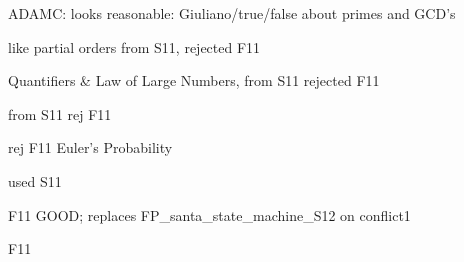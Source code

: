 \documentclass[quiz]{mcs}
\begin{document}
\conflictfinaltwo


\examspace 
\begin{editingnotes}
ADAMC: looks reasonable: Giuliano/true/false about primes and GCD's
\end{editingnotes}

\examspace 
\begin{editingnotes}like partial orders from S11, rejected F11\end{editingnotes}

\examspace  
\begin{editingnotes}
Quantifiers \& Law of Large Numbers, from S11 rejected F11
\end{editingnotes}

\examspace
\begin{editingnotes} from S11 rej F11\end{editingnotes}

\examspace  
\begin{editingnotes}rej F11 Euler's Probability\end{editingnotes}

\examspace 
\begin{editingnotes}used S11\end{editingnotes}

\examspace 
\begin{editingnotes}
F11 GOOD; replaces FP_santa_state_machine_S12 on conflict1
\end{editingnotes}

\examspace
\begin{editingnotes}F11\end{editingnotes}
\end{document}
